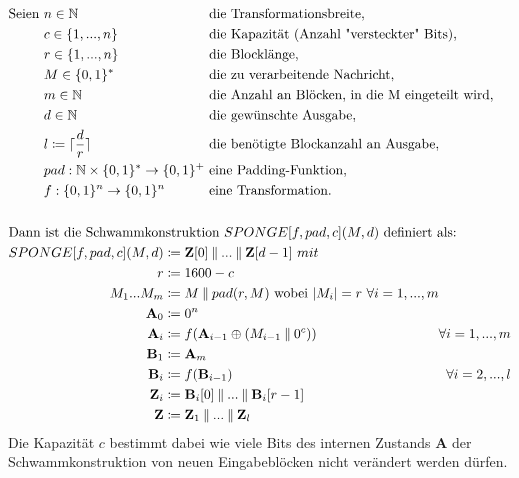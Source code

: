 \begin{align*}
    &\begin{alignedat}[t]{2}
        \text{Seien } & n \in \mathbb{N} && \text{ die Transformationsbreite}, \\
        & c \in \{1,...,n\} && \text{ die Kapazität (Anzahl "versteckter" Bits)}, \\
        & r \in \{1,...,n\} && \text{ die Blocklänge}, \\
        & M \in \{0,1\}^* && \text{ die zu verarbeitende Nachricht}, \\
        & m \in \mathbb{N} && \text{ die Anzahl an Blöcken, in die M eingeteilt wird}, \\
        & d \in \mathbb{N} && \text{ die gewünschte Ausgabe}, \\
        & l \coloneq \lceil \frac{d}{r} \rceil && \text{ die benötigte Blockanzahl an Ausgabe}, \\
        & pad: \mathbb{N} \times \{0,1\}^* \to \{0,1\}^+ && \text{ eine Padding-Funktion}, \\
        & f: \{0,1\}^n \to \{0,1\}^n && \text{ eine Transformation}.
    \end{alignedat} \\
    \\
    &\text{Dann ist die Schwammkonstruktion } SPONGE[f,pad,c](M,d) \text{ definiert als:} \\
    &\begin{alignedat}[t]{3}
        SPONGE[f,pad,c](M, d) & \coloneq \mathbf{Z}[0] \mathbin\Vert ... \mathbin\Vert \mathbf{Z}[d-1]\ mit \\
        r & \coloneq 1600 - c \\
        M_1...M_{m} & \coloneq M \mathbin\Vert pad(r, M) \text{ wobei } |M_i| = r\ \forall i = 1,...,m\\
        \mathbf{A}_0 & \coloneq 0^n \\
        \mathbf{A}_i & \coloneq f(\mathbf{A}_{i-1} \oplus (M_{i-1} \mathbin\Vert 0^c))\ & \forall i = 1,...,m \\
        \mathbf{B}_1 & \coloneq \mathbf{A}_{m} \\
        \mathbf{B}_i & \coloneq f(\mathbf{B}_{i-1})\ & \forall i = 2,...,l \\
        \mathbf{Z}_i & \coloneq \mathbf{B}_i[0] \mathbin\Vert ... \mathbin\Vert \mathbf{B}_i[r-1] \\
        \mathbf{Z} & \coloneq \mathbf{Z}_1 \mathbin\Vert ... \mathbin\Vert \mathbf{Z}_l
    \end{alignedat}
\end{align*}
Die Kapazität $c$ bestimmt dabei wie viele Bits des internen Zustands $\mathbf{A}$ der Schwammkonstruktion von neuen Eingabeblöcken
nicht verändert werden dürfen. 
	
